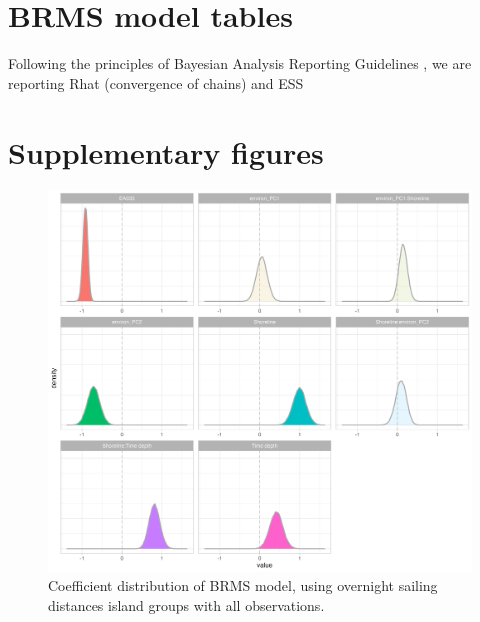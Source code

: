 \documentclass[unnumsec,webpdf,modern,medium]{oup-authoring-template}
\begin{document}
\begin{appendices}



\section{BRMS model tables}
\label{BRMS_model_tables}
Following the principles of Bayesian Analysis Reporting Guidelines \citep{kruschke2021bayesian}, we are reporting Rhat (convergence of chains) and ESS

\begin{landscape}

\end{landscape}

\begin{landscape}

\end{landscape}




\section{Supplementary figures}
\label{appendix_supp_figs}

\begin{figure}[ht]

\includegraphics[width=\textwidth]{brms_SBZR_group_full_effect_ridge_panels_plot.png}
\caption{Coefficient distribution of BRMS model, using overnight sailing distances island groups with all observations.}
\label{brms_SBZR_group_full_effect_ridge_panels}
\end{figure}


\end{appendices}
\end{document}
